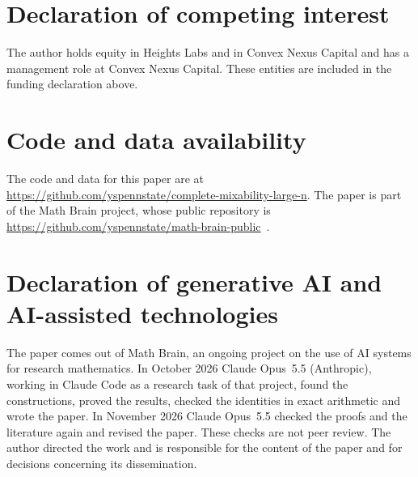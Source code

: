 ﻿\documentclass[11pt]{amsart}
\theoremstyle{remark}
\begin{document}
\section*{Declaration of competing interest}
The author holds equity in Heights Labs and in Convex Nexus Capital and has a management role at Convex Nexus Capital. These entities are included in the funding declaration above.

\section*{Code and data availability}
The code and data for this paper are at \url{https://github.com/yspennstate/complete-mixability-large-n}. The paper is part of the Math Brain project, whose public repository is \url{https://github.com/yspennstate/math-brain-public}~\cite{MathBrainRepo}.

\section*{Declaration of generative AI and AI-assisted technologies}
The paper comes out of Math Brain, an ongoing project on the use of AI systems for research mathematics. In October 2026 Claude Opus~5.5 (Anthropic), working in Claude Code as a research task of that project, found the constructions, proved the results, checked the identities in exact arithmetic and wrote the paper. In November 2026 Claude Opus~5.5 checked the proofs and the literature again and revised the paper. These checks are not peer review. The author directed the work and is responsible for the content of the paper and for decisions concerning its dissemination.



\end{document}
